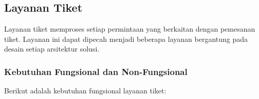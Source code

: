 \pagebreak

\subsection{Layanan Tiket}

Layanan tiket memproses setiap permintaan yang berkaitan dengan pemesanan tiket. Layanan ini dapat dipecah menjadi beberapa layanan bergantung pada desain setiap arsitektur solusi.

\subsubsection{Kebutuhan Fungsional dan Non-Fungsional}

Berikut adalah kebutuhan fungsional layanan tiket:

\begingroup
\footnotesize
